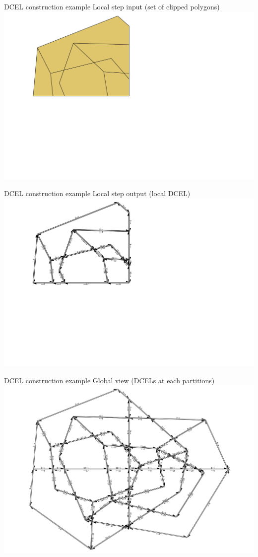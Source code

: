 \documentclass{beamer}
\begin{document}
\begin{frame}{DCEL construction example}
    \centering 
    Local step input (set of clipped polygons) \\
    \includegraphics[width=0.8\linewidth]{figures/DCEL04_mapPartition} 
\end{frame}

\begin{frame}{DCEL construction example}
    \centering 
    Local step output (local DCEL) \\
    \includegraphics[width=0.8\linewidth]{figures/DCEL05_localDCEL} 
\end{frame}

\begin{frame}{DCEL construction example}
    \centering 
    Global view (DCELs at each partitions) \\
    \includegraphics[width=0.8\linewidth]{figures/DCEL06_Merge} 
\end{frame}
\end{document}
